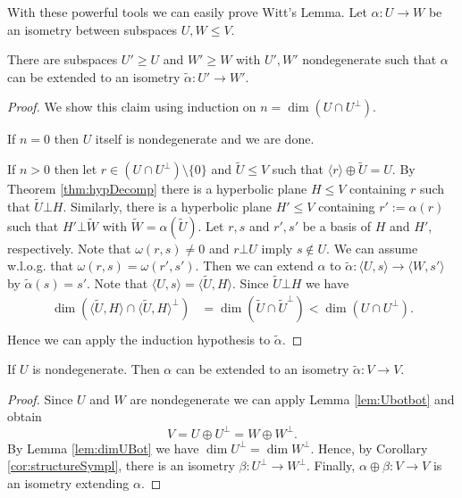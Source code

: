 With these powerful tools we can easily prove Witt's Lemma.
Let $\alpha\colon U\to W$ be an isometry between subspaces $U,W\leq V$.
\begin{lemma}\label{lem:wittPrep1}
There are subspaces $U'\geq U$ and $W'\geq W$ with $U',W'$ nondegenerate such that $\alpha$ can be extended to an isometry $\tilde{\alpha}\colon U'\to W'$.
\end{lemma}
\begin{proof}
We show this claim using induction on $n=\dim (U\cap U^\bot)$.

If $n=0$ then $U$ itself is nondegenerate and we are done.

If $n>0$ then let $r\in (U\cap U^\bot)\setminus\{0\}$ and $\tilde U\leq V$ such that $\langle r\rangle\oplus \tilde U=U$. By Theorem \ref{thm:hypDecomp} there is a hyperbolic plane $H\leq V$ containing $r$ such that $\tilde U\bot H$. 
Similarly, there is a hyperbolic plane $H'\leq V$ containing $r':=\alpha(r)$ such that $H'\bot\tilde{W}$ with $\tilde{W}=\alpha(\tilde{U})$. Let $r,s$ and $r',s'$ be a basis of $H$ and $H'$, respectively. Note that $\omega(r,s)\not=0$ and $r\bot U$ imply $s\notin U$. We can assume w.l.o.g. that $\omega(r,s)=\omega(r',s')$. Then we can extend $\alpha$ to $\tilde{\alpha}\colon \langle U,s\rangle\to \langle W,s'\rangle$ by $\tilde\alpha (s)= s'$. Note that $\langle U,s\rangle=\langle \tilde{U},H\rangle$. Since $\tilde{U}\bot H$ we have
\begin{align*}
\dim(\langle \tilde{U},H\rangle \cap \langle \tilde{U},H\rangle^\bot)&=\dim(\tilde{U}\cap \tilde{U}^\bot)<\dim(U\cap U^\bot).\\
\end{align*}
Hence we can apply the induction hypothesis to $\tilde{\alpha}$.
\end{proof}

\begin{lemma}\label{lem:wittPrep2}
If $U$ is nondegenerate. Then $\alpha$ can be extended to an isometry $\tilde{\alpha}\colon V\to V$.
\end{lemma}
\begin{proof}
Since $U$ and $W$ are nondegenerate we can apply Lemma \ref{lem:Ubotbot} and obtain \[V=U\oplus U^\bot=W\oplus W^\bot.\]
By Lemma \ref{lem:dimUBot} we have $\dim U^\bot=\dim W^\bot$. Hence, by Corollary \ref{cor:structureSympl}, there is an isometry $\beta\colon U^\bot\to W^\bot$. Finally, $\alpha\oplus \beta\colon V\to V$ is an isometry extending $\alpha$.
\end{proof}

